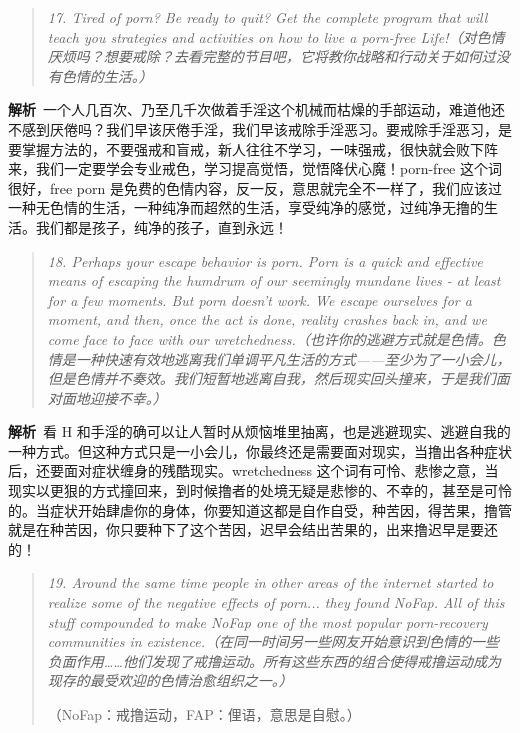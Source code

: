\begin{quote}\it
    17. Tired of porn? Be ready to quit? Get the complete program that will teach you strategies and activities on how to live a porn-free Life!（对色情厌烦吗？想要戒除？去看完整的节目吧，它将教你战略和行动关于如何过没有色情的生活。）
\end{quote}

\textbf{解析}\ 一个人几百次、乃至几千次做着手淫这个机械而枯燥的手部运动，难道他还不感到厌倦吗？我们早该厌倦手淫，我们早该戒除手淫恶习。要戒除手淫恶习，是要掌握方法的，不要强戒和盲戒，新人往往不学习，一味强戒，很快就会败下阵来，我们一定要学会专业戒色，学习提高觉悟，觉悟降伏心魔！porn-free 这个词很好，free porn 是免费的色情内容，反一反，意思就完全不一样了，我们应该过一种无色情的生活，一种纯净而超然的生活，享受纯净的感觉，过纯净无撸的生活。我们都是孩子，纯净的孩子，直到永远！

\begin{quote}\it
    18. Perhaps your escape behavior is porn. Porn is a quick and effective means of escaping the humdrum of our seemingly mundane lives - at least for a few moments. But porn doesn't work. We escape ourselves for a moment, and then, once the act is done, reality crashes back in, and we come face to face with our wretchedness.（也许你的逃避方式就是色情。色情是一种快速有效地逃离我们单调平凡生活的方式——至少为了一小会儿，但是色情并不奏效。我们短暂地逃离自我，然后现实回头撞来，于是我们面对面地迎接不幸。）
\end{quote}

\textbf{解析}\ 看 H 和手淫的确可以让人暂时从烦恼堆里抽离，也是逃避现实、逃避自我的一种方式。但这种方式只是一小会儿，你最终还是需要面对现实，当撸出各种症状后，还要面对症状缠身的残酷现实。wretchedness 这个词有可怜、悲惨之意，当现实以更狠的方式撞回来，到时候撸者的处境无疑是悲惨的、不幸的，甚至是可怜的。当症状开始肆虐你的身体，你要知道这都是自作自受，种苦因，得苦果，撸管就是在种苦因，你只要种下了这个苦因，迟早会结出苦果的，出来撸迟早是要还的！

\begin{quote}\it
    19. Around the same time people in other areas of the internet started to realize some of the negative effects of porn... they found NoFap. All of this stuff compounded to make NoFap one of the most popular porn-recovery communities in existence.（在同一时间另一些网友开始意识到色情的一些负面作用……他们发现了戒撸运动。所有这些东西的组合使得戒撸运动成为现存的最受欢迎的色情治愈组织之一。）

    （NoFap：戒撸运动，FAP：俚语，意思是自慰。）
\end{quote}

